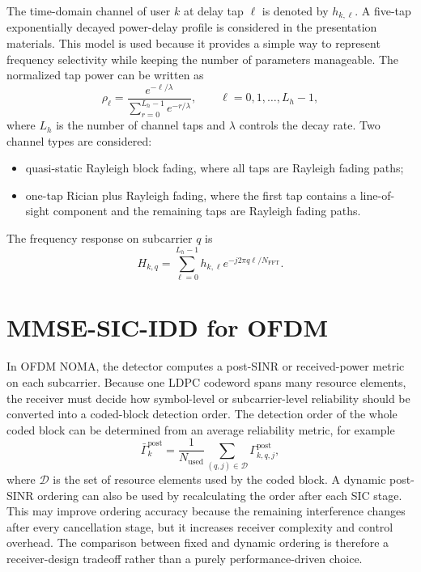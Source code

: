 The time-domain channel of user $k$ at delay tap $\ell$ is denoted by $h_{k,\ell}$. A five-tap exponentially decayed power-delay profile is considered in the presentation materials. This model is used because it provides a simple way to represent frequency selectivity while keeping the number of parameters manageable. The normalized tap power can be written as
\begin{equation}
    \rho_\ell
    =
    \frac{e^{-\ell/\lambda}}{\sum_{r=0}^{L_h-1}e^{-r/\lambda}},
    \qquad \ell=0,1,\ldots,L_h-1,
    \label{eq:exp-decay-profile}
\end{equation}
where $L_h$ is the number of channel taps and $\lambda$ controls the decay rate. Two channel types are considered:
\begin{itemize}
    \item quasi-static Rayleigh block fading, where all taps are Rayleigh fading paths;
    \item one-tap Rician plus Rayleigh fading, where the first tap contains a line-of-sight component and the remaining taps are Rayleigh fading paths.
\end{itemize}
The frequency response on subcarrier $q$ is
\begin{equation}
    H_{k,q}
    =
    \sum_{\ell=0}^{L_h-1} h_{k,\ell}
    e^{-j2\pi q\ell/N_{\mathrm{FFT}}}.
    \label{eq:ofdm-frequency-response}
\end{equation}


\section{MMSE-SIC-IDD for OFDM}

In OFDM NOMA, the detector computes a post-SINR or received-power metric on each subcarrier. Because one LDPC codeword spans many resource elements, the receiver must decide how symbol-level or subcarrier-level reliability should be converted into a coded-block detection order. The detection order of the whole coded block can be determined from an average reliability metric, for example
\begin{equation}
    \bar{\Gamma}^{\mathrm{post}}_k
    =
    \frac{1}{N_{\mathrm{used}}}
    \sum_{(q,j)\in\mathcal{D}}
    \Gamma^{\mathrm{post}}_{k,q,j},
    \label{eq:ofdm-average-post-sinr}
\end{equation}
where $\mathcal{D}$ is the set of resource elements used by the coded block. A dynamic post-SINR ordering can also be used by recalculating the order after each SIC stage. This may improve ordering accuracy because the remaining interference changes after every cancellation stage, but it increases receiver complexity and control overhead. The comparison between fixed and dynamic ordering is therefore a receiver-design tradeoff rather than a purely performance-driven choice.

